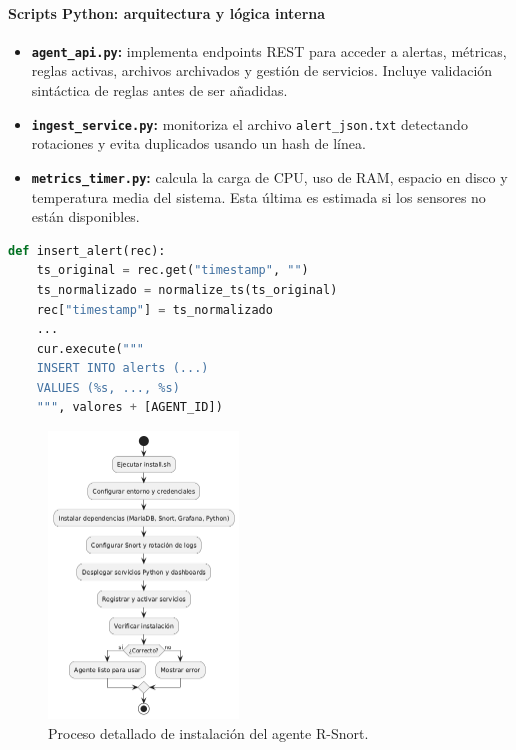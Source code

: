 \documentclass[11pt,a4paper,twoside]{report}
\begin{document}
\paragraph{Scripts Python: arquitectura y lógica interna}

\begin{itemize}
	\item \textbf{\texttt{agent\_api.py}:} implementa endpoints REST para acceder a alertas, métricas, reglas activas, archivos archivados y gestión de servicios. Incluye validación sintáctica de reglas antes de ser añadidas.
	\item \textbf{\texttt{ingest\_service.py}:} monitoriza el archivo \texttt{alert\_json.txt} detectando rotaciones y evita duplicados usando un hash de línea.
	\item \textbf{\texttt{metrics\_timer.py}:} calcula la carga de CPU, uso de RAM, espacio en disco y temperatura media del sistema. Esta última es estimada si los sensores no están disponibles.
\end{itemize}

\begin{lstlisting}[language=Python, caption={Fragmento de inserción de alerta en ingest\_service.py}]
	def insert_alert(rec):
	ts_original = rec.get("timestamp", "")
	ts_normalizado = normalize_ts(ts_original)
	rec["timestamp"] = ts_normalizado
	...
	cur.execute("""
	INSERT INTO alerts (...)
	VALUES (%s, ..., %s)
	""", valores + [AGENT_ID])
\end{lstlisting}

\begin{figure}[H]
	\centering
	 \includegraphics[width=0.45\textwidth]{documento/29.png}
	\caption{Proceso detallado de instalación del agente R-Snort.}
	\label{fig:bpmn-snort-agent}
\end{figure}
\end{document}
